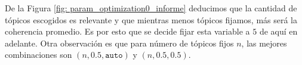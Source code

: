 \documentclass{article}
\begin{document}
 	De la Figura \ref{fig: param_optimization0_informe} deducimos que la cantidad de tópicos escogidos es relevante y que mientras menos tópicos fijamos, más será la coherencia promedio. Es por esto que se decide fijar esta variable a $5$ de aquí en adelante. Otra observación es que para número de tópicos fijos $n$, las mejores combinaciones son $(n, 0.5, \texttt{auto})$ y $(n, 0.5, 0.5)$.  


\end{document}
